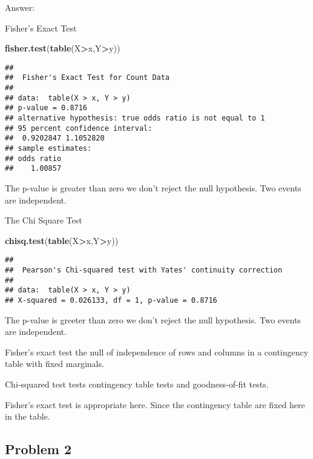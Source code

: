 \documentclass[]{article}
\newenvironment{Shaded}{\begin{snugshade}}{\end{snugshade}}
\newcommand{\KeywordTok}[1]{\textcolor[rgb]{0.13,0.29,0.53}{\textbf{#1}}}
\newcommand{\NormalTok}[1]{#1}
\newcommand{\OperatorTok}[1]{\textcolor[rgb]{0.81,0.36,0.00}{\textbf{#1}}}
\begin{document}
Answer:

Fisher's Exact Test

\begin{Shaded}
\begin{Highlighting}[]
\KeywordTok{fisher.test}\NormalTok{(}\KeywordTok{table}\NormalTok{(X}\OperatorTok{>}\NormalTok{x,Y}\OperatorTok{>}\NormalTok{y))}
\end{Highlighting}
\end{Shaded}

\begin{verbatim}
## 
##  Fisher's Exact Test for Count Data
## 
## data:  table(X > x, Y > y)
## p-value = 0.8716
## alternative hypothesis: true odds ratio is not equal to 1
## 95 percent confidence interval:
##  0.9202847 1.1052820
## sample estimates:
## odds ratio 
##    1.00857
\end{verbatim}

The p-value is greater than zero we don't reject the null hypothesis.
Two events are independent.

The Chi Square Test

\begin{Shaded}
\begin{Highlighting}[]
\KeywordTok{chisq.test}\NormalTok{(}\KeywordTok{table}\NormalTok{(X}\OperatorTok{>}\NormalTok{x,Y}\OperatorTok{>}\NormalTok{y))}
\end{Highlighting}
\end{Shaded}

\begin{verbatim}
## 
##  Pearson's Chi-squared test with Yates' continuity correction
## 
## data:  table(X > x, Y > y)
## X-squared = 0.026133, df = 1, p-value = 0.8716
\end{verbatim}

The p-value is greeter than zero we don't reject the null hypothesis.
Two events are independent.

Fisher's exact test the null of independence of rows and columns in a
contingency table with fixed marginals.

Chi-squared test tests contingency table tests and goodness-of-fit
tests.

Fisher's exact test is appropriate here. Since the contingency table are
fixed here in the table.

\hypertarget{problem-2}{%
\subsection{Problem 2}\label{problem-2}}
\end{document}
